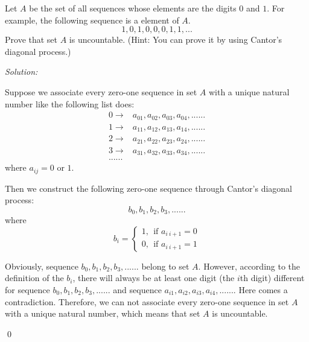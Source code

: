 \documentclass[12pt]{article}
\newenvironment{problem}[2][Problem]{\begin{trivlist}
\item[\hskip \labelsep {\bfseries #1}\hskip \labelsep {\bfseries #2.}]}{\end{trivlist}}
\newenvironment{sol}
    {\emph{Solution:}
    }
    {
    \qed
    }
\begin{document}
\begin{problem}{10}
Let $A$ be the set of all sequences whose elements are the digits $0$ and $1$. For example, the following sequence is a element of $A$.
\[1,0,1,0,0,0,1,1,...\]Prove that set $A$ is uncountable. (Hint: You can prove it by using Cantor's diagonal process.)
\end{problem}
\begin{sol}
Suppose we associate every zero-one sequence in set $A$ with a unique natural number like the following list does:
\begin{align*}
0\rightarrow&a_{01},a_{02},a_{03},a_{04},......\\
1\rightarrow&a_{11},a_{12},a_{13},a_{14},......\\
2\rightarrow&a_{21},a_{22},a_{23},a_{24},......\\
3\rightarrow&a_{31},a_{32},a_{33},a_{34},......\\
......&
\end{align*}
where $a_{ij}=0$ or $1$.

Then we construct the following zero-one sequence through Cantor's diagonal process:
\[
b_0,b_1,b_2,b_3,......
\]
where
\[
b_i=\left\{\begin{array}{ll}
1,~~\text{if }a_{i~i+1}=0\\
0,~~\text{if }a_{i~i+1}=1
\end{array}\right.
\]

Obviously, sequence $b_0,b_1,b_2,b_3,......$ belong to set $A$. However, according to the definition of the $b_i$, there will always be at least one digit (the $i$th digit) different for sequence $b_0,b_1,b_2,b_3,......$ and sequence $a_{i1},a_{i2},a_{i3},a_{i4},......$. Here comes a contradiction. Therefore, we can not associate every zero-one sequence in set $A$ with a unique natural number, which means that set $A$ is uncountable.
\end{sol}
\end{document}
